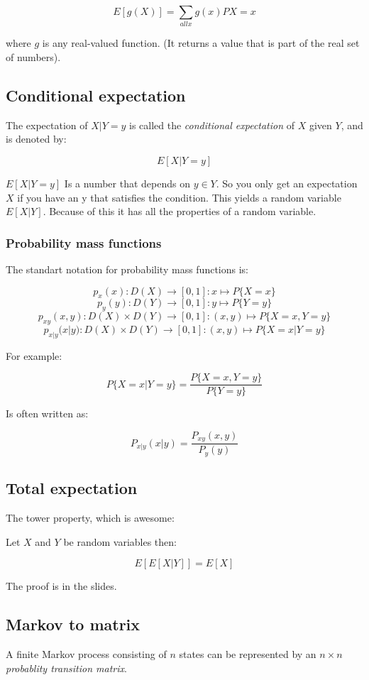 \documentclass{article}
\begin{document}
\[E[g(X)]=\sum_{all x} g(x)P{X=x}\]

where $g$ is any real-valued function. (It returns a value that is part
of the real set of numbers).

\subsection{Conditional expectation}
The expectation of $X | Y = y$ is called the \emph{conditional expectation}
of $X$ given $Y$, and is denoted by:

\[E[X|Y=y]\]

$E[X|Y=y]$ Is a number that depends on $y \in Y$. So you only get an
expectation $X$ if you have an y that satisfies the condition.
This yields a random variable $E[X|Y]$. Because of this it has all the
properties of a random variable.

\subsubsection{Probability mass functions}
The standart notation for probability mass functions is:

\[p_x(x): D(X) \to [0,1]: x \mapsto P\{X=x\} \]
\[p_y(y): D(Y) \to [0,1]: y \mapsto P\{Y=y\} \]
\[p_{xy}(x,y): D(X) \times D(Y) \to [0,1]: (x,y) \mapsto P\{X=x,Y=y\} \]
\[p_{x|y}(x|y): D(X) \times D(Y) \to [0,1]: (x,y) \mapsto P\{X=x|Y=y\} \]

For example:

\[ P\{X=x|Y=y\}=\frac{P\{X=x,Y=y\}}{P\{Y=y\}}\]

Is often written as:

\[P_{x|y}(x|y)=\frac{P_{xy}(x,y)}{P_y(y)}\]

\subsection{Total expectation}
The tower property, which is awesome:

Let $X$ and $Y$ be random variables then:

\[ E[E[X|Y]] = E[X] \]

The proof is in the slides.

\subsection{Markov to matrix}
A finite Markov process consisting of $n$ states can be represented by an 
$n\times n$ \emph{probablity transition matrix}.
\end{document}
